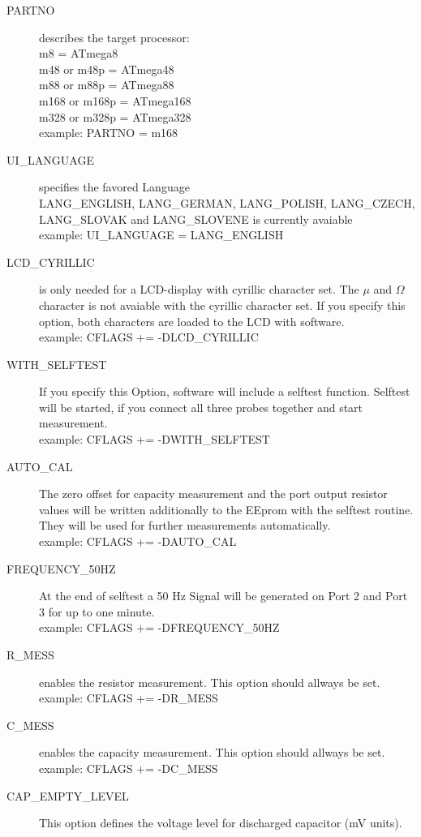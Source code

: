 \begin{description}
  \item[PARTNO] describes the target processor:\\
         m8 = ATmega8\\
         m48 or m48p = ATmega48\\
         m88 or m88p = ATmega88\\
         m168 or m168p = ATmega168\\
         m328 or m328p = ATmega328\\
    example:  PARTNO = m168
  \item[UI\_LANGUAGE] specifies the favored Language\\
    LANG\_ENGLISH, LANG\_GERMAN, LANG\_POLISH, LANG\_CZECH, LANG\_SLOVAK and LANG\_SLOVENE is currently avaiable \\
    example:  UI\_LANGUAGE = LANG\_ENGLISH
  \item[LCD\_CYRILLIC] is only needed for a LCD-display with cyrillic character set. The \(\mu\) and \(\Omega\) character
is not avaiable with the cyrillic character set.
If you specify this option, both characters are loaded to the LCD with software.\\
example: CFLAGS += -DLCD\_CYRILLIC
  \item[WITH\_SELFTEST] If you specify this Option, software will include a selftest function.
Selftest will be started, if you connect all three probes together and start measurement.\\
example: CFLAGS += -DWITH\_SELFTEST
  \item[AUTO\_CAL] The zero offset for capacity measurement and the port output resistor values will be written additionally
to the EEprom with the selftest routine. They will be used for further measurements automatically.\\
example: CFLAGS += -DAUTO\_CAL
  \item[FREQUENCY\_50HZ] At the end of selftest a 50 Hz Signal will be generated on Port 2 and Port 3 for up to one minute.\\
example: CFLAGS += -DFREQUENCY\_50HZ
  \item[R\_MESS] enables the resistor measurement. This option should allways be set.\\
example: CFLAGS += -DR\_MESS
  \item[C\_MESS] enables the capacity measurement. This option should allways be set.\\
example: CFLAGS += -DC\_MESS
  \item[CAP\_EMPTY\_LEVEL]  This option defines the voltage level for discharged capacitor (mV units).

\end{description}
